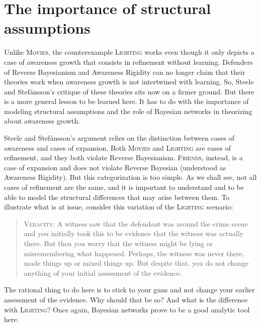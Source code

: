 \documentclass[
  11pt,
  dvipsnames,enabledeprecatedfontcommands]{scrartcl}
\begin{document}
\hypertarget{the-importance-of-structural-assumptions}{%
\section{The importance of structural
assumptions}\label{the-importance-of-structural-assumptions}}

\label{sec:structural}

Unlike \textsc{Movies}, the counterexample \textsc{Lighting} works even
though it only depicts a case of awareness growth that consists in
refinement without learning. Defenders of Reverse Bayesianism and
Awareness Rigidity can no longer claim that their theories work when
awareness growth is not intertwined with learning. So, Steele and
Stefánsson's critique of these theories sits now on a firmer ground. But
there is a more general lesson to be learned here. It has to do with the
importance of modeling structural assumptions and the role of Bayesian
networks in theorizing about awareness growth.

Steele and Stefánsson's argument relies on the distinction between cases
of awareness and cases of expansion. Both \textsc{Movies} and
\textsc{Lighting} are cases of refinement, and they both violate Reverse
Bayesianism. \textsc{Friends}, instead, is a case of expansion and does
not violate Reverse Bayesian (understood as Awareness Rigidity). But
this categorization is too simple. As we shall see, not all cases of
refinement are the same, and it is important to understand and to be
able to model the structural differences that may arise between them. To
illustrate what is at issue, consider this variation of the
\textsc{Lighting} scenario:

\begin{quote}
\textsc{Veracity}: A witness saw that the defendant was around the crime
scene and you initially took this to be evidence that the witness was
actually there. But then you worry that the witness might be lying or
misremembering what happened. Perhaps, the witness was never there, made
things up or mixed things up. But despite that, you do not change
anything of your initial assessment of the evidence.
\end{quote}

\noindent   The rational thing to do here is to stick to your guns and
not change your earlier assessment of the evidence. Why should that be
so? And what is the difference with \textsc{Lighting}? Once again,
Bayesian networks prove to be a good analytic tool here.
\end{document}
